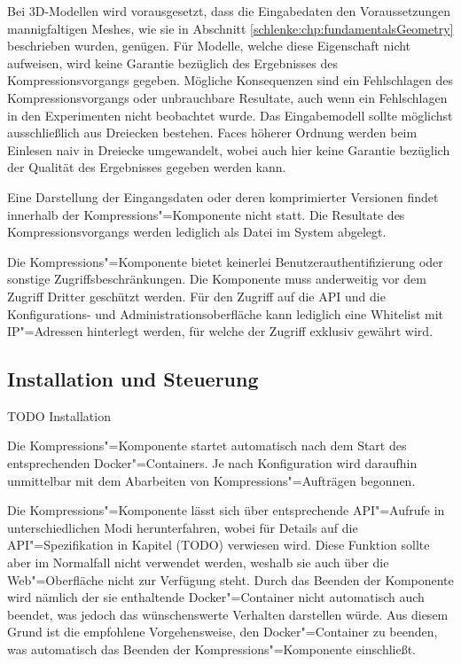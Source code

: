 Bei 3D-Modellen wird vorausgesetzt, dass die Eingabedaten den Voraussetzungen mannigfaltigen Meshes, wie sie in Abschnitt \ref{schlenke:chp:fundamentalsGeometry} beschrieben wurden, genügen. Für Modelle, welche diese Eigenschaft nicht aufweisen, wird keine Garantie bezüglich des Ergebnisses des Kompressionsvorgangs gegeben. Mögliche Konsequenzen sind ein Fehlschlagen des Kompressionsvorgangs oder unbrauchbare Resultate, auch wenn ein Fehlschlagen in den Experimenten nicht beobachtet wurde. Das Eingabemodell sollte möglichst ausschließlich aus Dreiecken bestehen. Faces höherer Ordnung werden beim Einlesen naiv in Dreiecke umgewandelt, wobei auch hier keine Garantie bezüglich der Qualität des Ergebnisses gegeben werden kann. 

Eine Darstellung der Eingangsdaten oder deren komprimierter Versionen findet innerhalb der Kompressions"=Komponente nicht statt. Die Resultate des Kompressionsvorgangs werden lediglich als Datei im System abgelegt.

Die Kompressions"=Komponente bietet keinerlei Benutzerauthentifizierung oder sonstige Zugriffsbeschränkungen. Die Komponente muss anderweitig vor dem Zugriff Dritter geschützt werden. Für den Zugriff auf die API und die Konfigurations- und Administrationsoberfläche kann lediglich eine Whitelist mit IP"=Adressen hinterlegt werden, für welche der Zugriff exklusiv gewährt wird.

\subsection{Installation und Steuerung }

TODO Installation

Die Kompressions"=Komponente startet automatisch nach dem Start des entsprechenden Docker"=Containers. Je nach Konfiguration wird daraufhin unmittelbar mit dem Abarbeiten von Kompressions"=Aufträgen begonnen. 

Die Kompressions"=Komponente lässt sich über entsprechende API"=Aufrufe in unterschiedlichen Modi herunterfahren, wobei für Details auf die API"=Spezifikation in Kapitel (TODO) verwiesen wird. Diese Funktion sollte aber im Normalfall nicht verwendet werden, weshalb sie auch über die Web"=Oberfläche nicht zur Verfügung steht. Durch das Beenden der Komponente wird nämlich der sie enthaltende Docker"=Container nicht automatisch auch beendet, was jedoch das wünschenswerte Verhalten darstellen würde. Aus diesem Grund ist die empfohlene Vorgehensweise, den Docker"=Container zu beenden, was automatisch das Beenden der Kompressions"=Komponente einschließt. 

